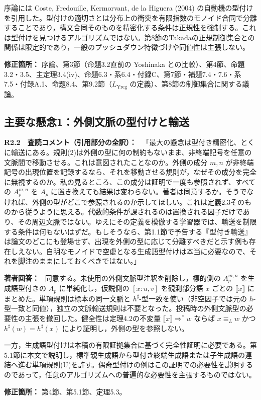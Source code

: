 \documentclass[10pt,a4paper]{ltjsarticle}
\newcommand{\NT}[1]{\llbracket #1\rrbracket}
\newcommand{\Comment}[1]{\par\medskip\noindent\textbf{#1　査読コメント（引用部分の全訳）：}\ }
\newcommand{\Reply}{\par\noindent\textbf{著者回答：}\ }
\newcommand{\Location}[1]{\par\noindent\textbf{修正箇所：} #1\par}
\begin{document}
序論には Coste, Fredouille, Kermorvant, de la Higuera (2004) の自動機の型付けを引用した。型付けの適切さとは分布上の衝突を有限指数のモノイド合同で分離することであり，構文合同そのものを精密化する条件は正規性を強制する。これは型付けを見つけるアルゴリズムではない。第8節のTakadaの正規制御集合との関係は限定的であり，一般のプッシュダウン特徴づけや同値性は主張しない。
\Location{序論、第3節（命題3.2直前の Yoshinaka との比較）、第4節、命題3.2・3.5、主定理3.4(iv)、命題6.3・系6.4・付録C、第7節・補題7.4・7.6・系7.5・付録A.1、命題8.4、第9.2節（$L_{\mathrm{Yreg}}$ の定義）、第8節の制御集合に関する議論。}

\subsection*{主要な懸念1：外側文脈の型付けと輸送}
\Comment{R2.2}
「最大の懸念は型付き精密化、とくに輸送にある。規則(2)は外側の型に何の制約もないまま、非終端記号を任意の文脈間で移動させる。これは意図されたことなのか。外側の成分 $m,n$ が非終端記号の出現位置を記録するなら、それを移動させる規則が，なぜその成分を完全に無視するのか。私の見るところ、この成分は証明で一度も参照されず、すべての $A^{m,n}_p$ を $A_p$ に置き換えても結果は変わらない。著者は同意するか。そうでなければ、外側の型がどこで参照されるのか示してほしい。これは定義2.3そのものから従うように思える。代数的条件が課されるのは置換される因子だけであり、その周辺文脈ではない。ゆえにその定義を模倣する学習器では、輸送を制限する条件は何もないはずだ。もしそうなら、第1.1節で予告する『型付き輸送』は論文のどこにも登場せず、出現を外側の型に応じて分離すべきだと示す例も存在しえない。自明なモノイドで空虚となる生成語型付けは本当に必要なので、それを脚注のままにしておくべきではない。」

\Reply
同意する。未使用の外側文脈型注釈を削除し，標的側の $A_p^{m,n}$ を生成語型付きの $A_p$ に単純化し，仮説側の $[x:u,v]$ を観測部分語 $x$ ごとの $\NT{x}$ にまとめた。単項規則は標本の同一文脈と $h^\sharp$-型一致を使い（非空因子では元の $h$-型一致と同値），独立の文脈輸送規則は不要となった。投稿時の外側文脈型の必要性の主張を撤回した。健全性は定理4.2の不変量 $\NT{x}\Rightarrow^*w$ ならば $x\equiv_Lw$ かつ $h^\sharp(w)=h^\sharp(x)$ により証明し，外側の型を参照しない。

一方，生成語型付けは本稿の有限証拠集合に基づく完全性証明に必要である。第5.1節に本文で説明し，標準親生成語から型付き終端生成語または子生成語の連結へ進む単項規則(U)を許す。偶奇型付けの例はこの証明での必要性を説明するのであって，任意のアルゴリズムへの普遍的な必要性を主張するものではない。
\Location{第4節、第5.1節、定理5.3。}
\end{document}
